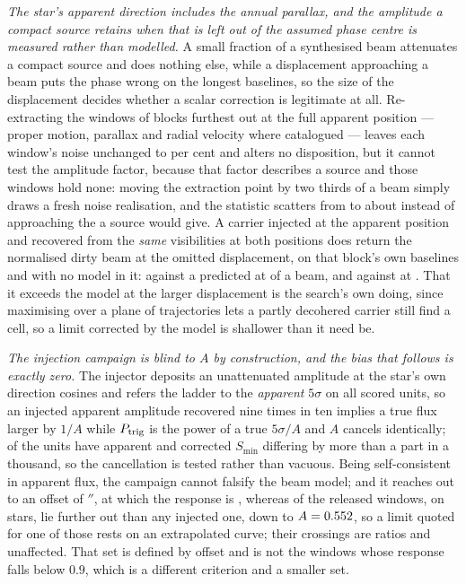 \emph{The star's apparent direction includes the annual parallax, and the
amplitude a compact source retains when that is left out of the assumed phase
centre is measured rather than modelled.} A small fraction of a synthesised
beam attenuates a compact source and does nothing else, while a displacement
approaching a beam puts the phase wrong on the longest baselines, so the size
of the displacement decides whether a scalar correction is legitimate at all.
Re-extracting the \SensNReextWin{} windows of \SensNReextBlock{} blocks
furthest out at the full apparent position --- proper motion, parallax and
radial velocity where catalogued --- leaves each window's noise unchanged to
\SensReextNoiseMaxPct{} per cent and alters no disposition, but it cannot test
the amplitude factor, because that factor describes a source and those windows
hold none: moving the extraction point by two thirds of a beam simply draws a
fresh noise realisation, and the statistic scatters from \SensReTstarLo{} to
\SensReTstarHi{} about \SensReTstarMed{} instead of approaching the
\SensPxLargePred{} a source would give. A carrier injected at the apparent
position and recovered from the \emph{same} visibilities at both positions
does return the normalised dirty beam at the omitted displacement, on that
block's own baselines and with no model in it: \SensPxSmallMeas{} against a
predicted \SensPxSmallPred{} at \SensPxSmallBeams{} of a beam, and
\SensPxLargeMeas{} against \SensPxLargePred{} at \SensPxLargeBeams. That it
exceeds the model at the larger displacement is the search's own doing, since
maximising over a plane of trajectories lets a partly decohered carrier still
find a cell, so a limit corrected by the model is shallower than it need be.

\emph{The injection campaign is blind to $A$ by construction, and the bias
that follows is exactly zero.} The injector deposits an unattenuated amplitude
at the star's own direction cosines and refers the ladder to the
\emph{apparent} $5\sigma$ on all \PbInjNUnit{} scored units, so an injected
apparent amplitude recovered nine times in ten implies a true flux larger by
$1/A$ while $P_{\rm trig}$ is the power of a true $5\sigma/A$ and $A$ cancels
identically; \PbInjNDistinct{} of the units have apparent and corrected
$S_{\min}$ differing by more than a part in a thousand, so the cancellation
is tested rather than vacuous. Being self-consistent in apparent flux, the
campaign cannot falsify the beam model; and it reaches out to an offset of
\PbInjOffMax$''$, at which the response is \PbInjAMin, whereas \PbNBeyond{}
of the \PbNWin{} released windows, on \PbNBeyondStar{} stars, lie further out
than any injected one, down to $A=0.552$, so a limit quoted for one
of those rests on an extrapolated curve; their \PbNBeyondCross{} crossings
are ratios and unaffected. That set is defined by offset and is not the
\RpPbNLowApplied{} windows whose response falls below $0.9$, which is a
different criterion and a smaller set.

